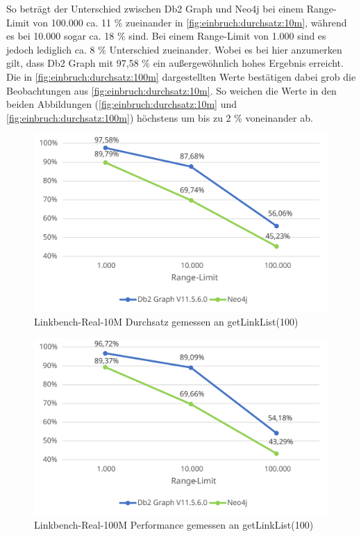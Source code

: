 So beträgt der Unterschied zwischen Db2 Graph und Neo4j bei einem Range-Limit von 100.000 ca. 11 \% zueinander in \autoref{fig:einbruch:durchsatz:10m}, während es bei 10.000 sogar ca. 18 \% sind. Bei einem Range-Limit von 1.000 sind es jedoch lediglich ca. 8 \% Unterschied zueinander. Wobei es bei hier anzumerken gilt, dass Db2 Graph mit 97,58 \% ein außergewöhnlich hohes Ergebnis erreicht. Die in \autoref{fig:einbruch:durchsatz:100m} dargestellten Werte bestätigen dabei grob die Beobachtungen aus \autoref{fig:einbruch:durchsatz:10m}. So weichen die Werte in den beiden Abbildungen (\autoref{fig:einbruch:durchsatz:10m} und \autoref{fig:einbruch:durchsatz:100m}) höchstens um bis zu 2 \% voneinander ab. 

\begin{figure}[!ht]
    \centering
    \includegraphics[width=\textwidth]{images/diagramme/limit_relative_durchsatz_real_10m.pdf}
    \caption{Linkbench-Real-10M Durchsatz gemessen an getLinkList(100)}
    \label{fig:einbruch:durchsatz:10m}
\end{figure}

\begin{figure}[!ht]
    \centering
    \includegraphics[width=\textwidth]{images/diagramme/limit_relative_durchsatz_real_100m.pdf}
    \caption{Linkbench-Real-100M Performance gemessen an getLinkList(100)}
    \label{fig:einbruch:durchsatz:100m}
\end{figure}

